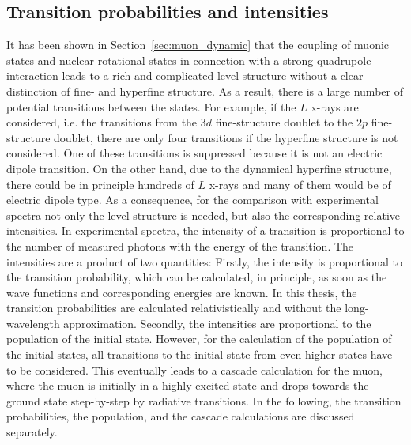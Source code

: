 %

\subsection{Transition probabilities and intensities}
\label{sec:transitions}
It has been shown in Section~\ref{sec:muon_dynamic} that the coupling of muonic states and nuclear rotational states in connection with a strong quadrupole interaction leads to a rich and complicated level structure without a clear distinction of fine- and hyperfine structure. As a result, there is a large number of potential transitions between the states. For example, if the $L$ x-rays are considered, i.e. the transitions from the $3d$ fine-structure doublet to the $2p$ fine-structure doublet, there are only four transitions if the hyperfine structure is not considered. One of these transitions is suppressed because it is not an electric dipole transition. On the other hand, due to the dynamical hyperfine structure, there could be in principle hundreds of $L$ x-rays and many of them would be of electric dipole type. As a consequence, for the comparison with experimental spectra not only the level structure is needed, but also the corresponding relative intensities. In experimental spectra, the intensity of a transition is proportional to the number of measured photons with the energy of the transition. The intensities are a product of two quantities:
Firstly, the intensity is proportional to the transition probability, which can be calculated, in principle, as soon as the wave functions and corresponding energies are known. In this thesis, the transition probabilities are calculated relativistically and without the long-wavelength approximation.
Secondly, the intensities are proportional to the population of the initial state. However, for the calculation of the population of the initial states, all transitions to the initial state from even higher states have to be considered. This eventually leads to a cascade calculation for the muon, where the muon is initially in a highly excited state and drops towards the ground state step-by-step by radiative transitions. In the following, the transition probabilities, the population, and the cascade calculations are discussed separately.\\

